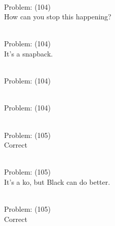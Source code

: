 \documentclass[11pt]{article}
\begin{document}
\begin{minipage}[t]{0.5\textwidth}
  {\centering
  
\\
Problem: (104)\\
How can you stop this happening?\\
  }
\end{minipage}
\begin{minipage}[t]{0.5\textwidth}
  {\centering
  
\\
Problem: (104)\\
It's a snapback.\\
  }
\end{minipage}
\begin{minipage}[t]{0.5\textwidth}
  {\centering
  
\\
Problem: (104)\\
  }
\end{minipage}
\begin{minipage}[t]{0.5\textwidth}
  {\centering
  
\\
Problem: (104)\\
  }
\end{minipage}
\begin{minipage}[t]{0.5\textwidth}
  {\centering
  
\\
Problem: (105)\\
Correct\\
  }
\end{minipage}
\begin{minipage}[t]{0.5\textwidth}
  {\centering
  
\\
Problem: (105)\\
It's a ko, but Black can do better.\\
  }
\end{minipage}
\begin{minipage}[t]{0.5\textwidth}
  {\centering
  
\\
Problem: (105)\\
Correct\\
  }
\end{minipage}
\end{document}
